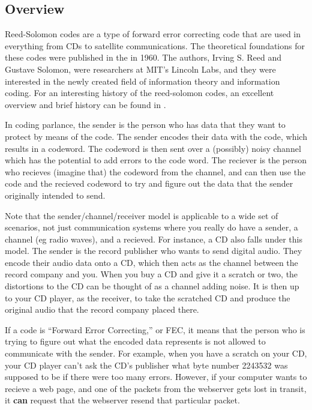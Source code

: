 \subsection{Overview}
Reed-Solomon codes are a type of forward error correcting code that are used in everything from CDs to
satellite communications. The theoretical foundations for these codes were published in the 
in 1960\cite{reed-solomon}. The authors, Irving S. Reed and Gustave Solomon, were researchers
at MIT's Lincoln Labs, and they were interested in the newly created field of information theory
and information coding. For an
interesting history of the reed-solomon codes, an excellent overview and brief history can be
found in \cite{reed-solomon-overview}.

In coding parlance, the sender is the person who has data that they want to protect by means
of the code. The sender encodes their data with the code, which results in a codeword.
The codeword is then sent over a (possibly) noisy channel which has the potential to 
add errors to the code word. The reciever is the person who recieves (imagine that)
the codeword from the channel, and can then use the code and the recieved codeword to
try and figure out the data that the sender originally intended to send.

Note that the sender/channel/receiver model is applicable to a wide set of scenarios, not
just communication systems where you really do have a sender, a channel (eg radio waves), and
a recieved. For instance, a CD also falls under this model. The sender is the record publisher
who wants to send digital audio. They encode their audio data onto a CD, which then acts as 
the channel between the record company and you. When you buy a CD and give it a scratch or two,
the distortions to the CD can be thought of as a channel adding noise. It is then up to your CD 
player, as the receiver, to take the scratched CD and produce the original audio that the
record company placed there.

If a code is ``Forward Error Correcting,'' or FEC, it means that the person who is trying to figure out
what the encoded data represents is not allowed to communicate with the sender. For example, when you
have a scratch on your CD, your CD player can't ask the CD's publisher what byte number 2243532 was supposed
to be if there were too many errors. However, if your computer wants to recieve a web page, and one of the packets
from the webserver gets lost in transit, it \textbf{can} request that the webserver resend that particular
packet.


